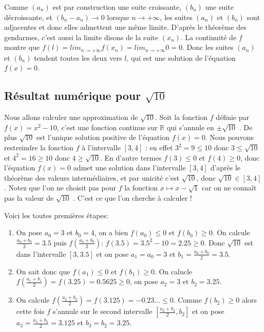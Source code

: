 \documentclass[a4paper,12pt]{article}
\begin{document}
    \vspace{0.5cm}
    
    Comme $(a_n)$ est par construction une suite croissante, $(b_n)$ une suite décroissante, et $(b_n - a_n) \rightarrow 0$ lorsque $n \rightarrow +\infty$, les suites $(a_n)$ et $(b_n)$ sont adjacentes et donc elles admettent une même limite. D'après le théorème des gendarmes, c'est aussi la limite disons de la suite $(x_n)$. La continuité de $f$ montre que
    $f(l) = lim_{n \rightarrow +\infty}f(x_n) = lim_{n \rightarrow +\infty} 0 = 0$. Donc les suites $(a_n)$ et $(b_n)$ tendent toutes les deux vers $l$, qui est
    une solution de l'équation $f (x) = 0$.
    
\subsection{Résultat numérique pour $\sqrt{10}$}
    Nous allons calculer une approximation de $\sqrt{10}$. Soit la fonction $f$ définie par $f (x) = x^2 - 10$, c'est une fonction continue sur $\mathbb{R}$ qui s'annule en $\pm \sqrt{10}$ . De plus $\sqrt{10}$ est l'unique solution positive de l'équation $f (x) = 0$. Nous pouvons restreindre la fonction $f$ à l'intervalle $[3, 4]$ : en effet $3^2 = 9 \leq 10$ donc $3 \leq \sqrt{10}$ et $4^2 = 16 \geq 10$ donc $4 \geq \sqrt{10}$. En d'autre termes $f(3) \leq 0$ et $f(4) \geq 0$, donc l'équation $f (x) = 0$ admet une solution dans l'intervalle $[3, 4]$ d'après le théorème des valeurs intermédiaires, et par unicité c'est $\sqrt{10}$, donc $ \sqrt{10} \in [3, 4]$.
    Notez que l'on ne choisit pas pour $f$ la fonction $x \mapsto x - \sqrt{1}$ car on ne connaît pas la valeur de $\sqrt{10}$ . C'est ce que l'on cherche à calculer !

    \vspace{0.5cm}
    
    Voici les toutes premières étapes:
    \begin{enumerate}
        \item On pose $a_0 = 3$ et $b_0 = 4$, on a bien $f(a_0) \leq 0$ et $f(b_0) \geq 0$. On calcule $\frac{a_0 + b_0}{2} = 3.5$ puis $f(\frac{a_0 + b_0}{2})$: $f(3.5) = 3.5^2 - 10 = 2.25 \geq 0$. Donc $\sqrt{10}$ est dans l'intervalle $[3, 3.5]$ et on pose $a_1 = a_0 = 3$ et $b_1 = \frac{a_0 + b_0}{2} = 3.5$.
        
        \item On sait donc que $f(a_1) \leq 0$ et $f(b_1) \geq 0$. On calucle $f(\frac{a_1+b_1}{2}) = f(3.25) = 0.5625 \geq 0$, on pose $a_2 = 3$ et $b_2 = 3.25$.
        
        \item On calcule $f(\frac{a_2 + b_2}{2}) = f(3.125) = -0.23\dots \leq 0$. Comme $f(b_2) \geq 0$ alors cette fois $f$ s'annule sur le second intervalle $[\frac{a_2+b_2}{2}, b_2]$ et on pose $a_3 = \frac{a_2+b_2}{2} = 3.125$ et $b_3 = b_2 = 3.25$.  
    \end{enumerate}
\end{document}
